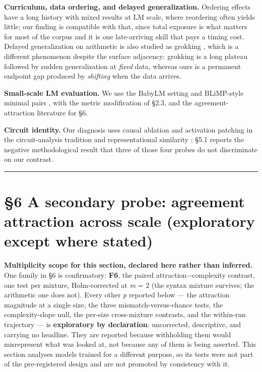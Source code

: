 \documentclass[11pt]{article}
\begin{document}
\textbf{Curriculum, data ordering, and delayed generalization.} Ordering effects have a long
history \citep{bengio-etal-2009} with mixed results at LM scale, where reordering often yields
little; our finding is compatible with that, since total exposure is what matters for most
of the corpus and it is one late-arriving skill that pays a timing cost. Delayed
generalization on arithmetic is also studied as grokking \citep{power-etal-2022}, which is a
different phenomenon despite the surface adjacency: grokking is a long plateau followed by
sudden generalization at \emph{fixed} data, whereas ours is a permanent endpoint gap produced by
\emph{shifting} when the data arrives.

\textbf{Small-scale LM evaluation.} We use the BabyLM setting \citep{warstadt-etal-2023} and
BLiMP-style minimal pairs \citep{warstadt-etal-2020}, with the metric modification of §2.3, and
the agreement-attraction literature \citep{linzen-etal-2016,marvin-linzen-2018}
for §6.

\textbf{Circuit identity.} Our diagnosis uses causal ablation and activation patching in the
circuit-analysis tradition \citep{elhage-etal-2021,wang-etal-2023,meng-etal-2022} and
representational similarity \citep{kornblith-etal-2019}; §5.1 reports the negative
methodological result that three of those four probes do not discriminate on our contrast.

\begin{center}\rule{0.5\linewidth}{0.5pt}\end{center}

\section{§6 A secondary probe: agreement attraction across scale (exploratory except where stated)}\label{a-secondary-probe-agreement-attraction-across-scale-exploratory-except-where-stated}

\textbf{Multiplicity scope for this section, declared here rather than inferred.} One family in
§6 is confirmatory: \textbf{F6}, the paired attraction−complexity contrast, one test per mixture,
Holm-corrected at \emph{m} = 2 (the syntax mixture survives; the arithmetic one does not). Every
other \emph{p} reported below --- the attraction magnitude at a single size, the three
mismatch-versus-chance tests, the complexity-slope null, the per-size cross-mixture
contrasts, and the within-run trajectory --- is \textbf{exploratory by declaration}: uncorrected,
descriptive, and carrying no headline. They are reported because withholding them would
misrepresent what was looked at, not because any of them is being asserted. This section
analyses models trained for a different purpose, so its tests were not part of the
pre-registered design and are not promoted by consistency with it.
\end{document}
